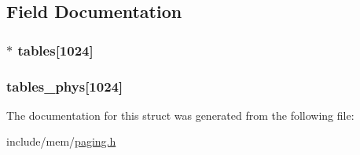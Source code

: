 \subsection{Field Documentation}
\subsubsection[{\texorpdfstring{tables}{tables}}]{$\ast$ tables\mbox{[}1024\mbox{]}}\hypertarget{structpage__dir_a3d121c0f2d5bf9079178a0889d26ae94}{}\label{structpage__dir_a3d121c0f2d5bf9079178a0889d26ae94}
\subsubsection[{\texorpdfstring{tables\+\_\+phys}{tables_phys}}]{ tables\+\_\+phys\mbox{[}1024\mbox{]}}\hypertarget{structpage__dir_a67d4c7f42d2b63673971e15ebabed897}{}\label{structpage__dir_a67d4c7f42d2b63673971e15ebabed897}


The documentation for this struct was generated from the following file\+:\begin{DoxyCompactItemize}
\item 
include/mem/\hyperlink{paging_8h}{paging.\+h}\end{DoxyCompactItemize}
